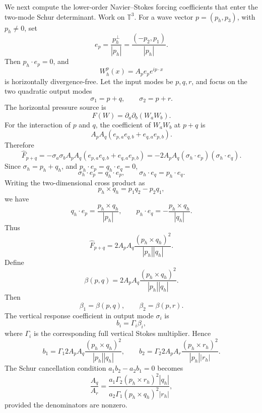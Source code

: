 \documentclass[11pt]{article}
\numberwithin{equation}{section}
\begin{document}
We next compute the lower-order Navier--Stokes forcing coefficients that enter the two-mode Schur determinant.  Work on \(\mathbb T^3\).  For a wave vector \(p=(p_h,p_3)\), with \(p_h\ne0\), set
\[
        e_p=\frac{p_h^\perp}{|p_h|}
        =\frac{(-p_2,p_1)}{|p_h|}.
\]
Then \(p_h\cdot e_p=0\), and
\[
        W_h^p(x)=A_p e_p e^{ip\cdot x}
\]
is horizontally divergence-free.  Let the input modes be \(p,q,r\), and focus on the two quadratic output modes
\[
        \sigma_1=p+q,
        \qquad
        \sigma_2=p+r.
\]
The horizontal pressure source is
\[
        F(W)=\partial_a\partial_b(W_aW_b).
\]
For the interaction of \(p\) and \(q\), the coefficient of \(W_aW_b\) at \(p+q\) is
\[
        A_pA_q(e_{p,a}e_{q,b}+e_{q,a}e_{p,b}).
\]
Therefore
\[
        \widehat F_{p+q}
        =-\sigma_a\sigma_bA_pA_q(e_{p,a}e_{q,b}+e_{q,a}e_{p,b})
        =-2A_pA_q(\sigma_h\cdot e_p)(\sigma_h\cdot e_q).
\]
Since \(\sigma_h=p_h+q_h\), and \(p_h\cdot e_p=q_h\cdot e_q=0\),
\[
        \sigma_h\cdot e_p=q_h\cdot e_p,
        \qquad
        \sigma_h\cdot e_q=p_h\cdot e_q.
\]
Writing the two-dimensional cross product as
\[
        p_h\times q_h=p_1q_2-p_2q_1,
\]
we have
\[
        q_h\cdot e_p=\frac{p_h\times q_h}{|p_h|},
        \qquad
        p_h\cdot e_q=-\frac{p_h\times q_h}{|q_h|}.
\]
Thus
\begin{equation}\label{eq:beta-pq}
        \widehat F_{p+q}
        =2A_pA_q\frac{(p_h\times q_h)^2}{|p_h||q_h|}.
\end{equation}
Define
\begin{equation}\label{eq:beta-def}
        \beta(p,q)=2A_pA_q\frac{(p_h\times q_h)^2}{|p_h||q_h|}.
\end{equation}
Then
\[
        \beta_1=\beta(p,q),
        \qquad
        \beta_2=\beta(p,r).
\]
The vertical response coefficient in output mode \(\sigma_i\) is
\[
        b_i=\Gamma_i\beta_i,
\]
where \(\Gamma_i\) is the corresponding full vertical Stokes multiplier.  Hence
\begin{equation}\label{eq:b1-b2-two-mode}
        b_1=\Gamma_1
        2A_pA_q\frac{(p_h\times q_h)^2}{|p_h||q_h|},
        \qquad
        b_2=\Gamma_2
        2A_pA_r\frac{(p_h\times r_h)^2}{|p_h||r_h|}.
\end{equation}
The Schur cancellation condition \(a_1b_2-a_2b_1=0\) becomes
\begin{equation}\label{eq:amplitude-ratio-schur}
        \frac{A_q}{A_r}
        =
        \frac{a_1\Gamma_2(p_h\times r_h)^2|q_h|}
        {a_2\Gamma_1(p_h\times q_h)^2|r_h|},
\end{equation}
provided the denominators are nonzero.
\end{document}
